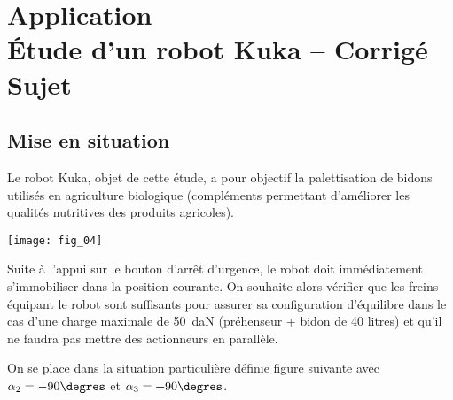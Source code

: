 \chapter*{Application  \\ 
Étude d'un robot Kuka -- \ifprof Corrigé \else Sujet \fi}

\iflivret {} \else
\ifprof  {} \else \fi
\fi

\setcounter{question}{0}




\section*{Mise en situation}
\ifprof
\else
\fi

Le robot Kuka, objet de cette étude, a pour objectif la palettisation de bidons utilisés en agriculture biologique (compléments permettant d'améliorer les qualités nutritives des produits agricoles).


\begin{marginfigure}
\texttt{[image: fig\_04]}
\end{marginfigure}

\begin{obj}
Suite à  l’appui  sur  le bouton d’arrêt d’urgence, le robot doit immédiatement s’immobiliser dans la position courante. On souhaite alors  vérifier  que  les  freins  équipant  le  robot  sont  suffisants  pour  assurer  sa  configuration 
d’équilibre dans le cas d’une charge maximale de \SI{50}{daN} (préhenseur + bidon de 40 litres) et 
qu’il ne faudra pas mettre des actionneurs en parallèle. 
\end{obj}

On se place dans la situation particulière définie figure suivante avec  $\alpha_2= -90\degres$ et $\alpha_3 = +90\degres$. 

